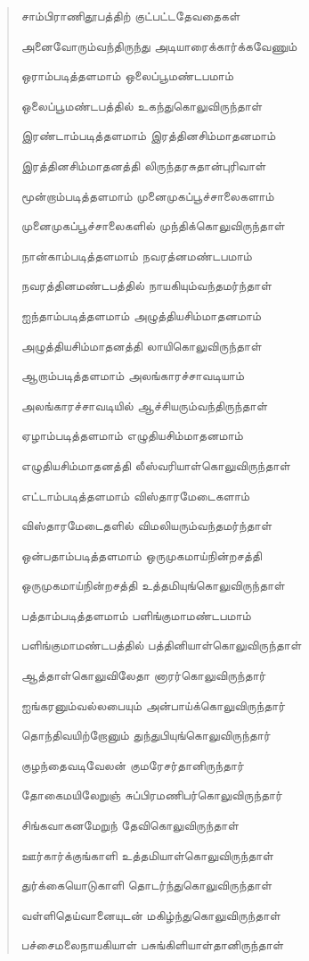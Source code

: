 \documentclass{article}
\begin{document}
\begin{quotation}
{சாம்பிராணிதூபத்திற் குட்பட்டதேவதைகள்

அனைவோரும்வந்திருந்து அடியாரைக்கார்க்கவேணும்

ஒராம்படித்தளமாம் ஒலைப்பூமண்டபமாம்

ஒலைப்பூமண்டபத்தில் உகந்துகொலுவிருந்தாள்

இரண்டாம்படித்தளமாம் இரத்தினசிம்மாதனமாம்

இரத்தினசிம்மாதனத்தி லிருந்தரசுதான்புரிவாள்

மூன்றாம்படித்தளமாம் முனைமுகப்பூச்சாலைகளாம்

முனைமுகப்பூச்சாலைகளில் முந்திக்கொலுவிருந்தாள்

நான்காம்படித்தளமாம் நவரத்னமண்டபமாம்

நவரத்தினமண்டபத்தில் நாயகியும்வந்தமர்ந்தாள்

ஐந்தாம்படித்தளமாம் அழுத்தியசிம்மாதனமாம்

அழுத்தியசிம்மாதனத்தி லாயிகொலுவிருந்தாள்

ஆறாம்படித்தளமாம் அலங்காரச்சாவடியாம்

அலங்காரச்சாவடியில் ஆச்சியரும்வந்திருந்தாள்

ஏழாம்படித்தளமாம் எழுதியசிம்மாதனமாம்

எழுதியசிம்மாதனத்தி லீஸ்வரியாள்கொலுவிருந்தாள்

எட்டாம்படித்தளமாம் விஸ்தாரமேடைகளாம்

விஸ்தாரமேடைதளில் விமலியரும்வந்தமர்ந்தாள்

ஒன்பதாம்படித்தளமாம் ஒருமுகமாய்நின்றசத்தி

ஒருமுகமாய்நின்றசத்தி உத்தமியுங்கொலுவிருந்தாள்

பத்தாம்படித்தளமாம் பளிங்குமாமண்டபமாம்

பளிங்குமாமண்டபத்தில் பத்தினியாள்கொலுவிருந்தாள்

ஆத்தாள்கொலுவிலேதா னாரர்கொலுவிருந்தார்

ஐங்கரனும்வல்லபையும் அன்பாய்க்கொலுவிருந்தார்

தொந்திவயிற்றோனும் துந்துபியுங்கொலுவிருந்தார்

குழந்தைவடிவேலன் குமரேசர்தானிருந்தார்

தோகைமயிலேறுஞ் சுப்பிரமணிபர்கொலுவிருந்தார்

சிங்கவாகனமேறுந் தேவிகொலுவிருந்தாள்

ஊர்கார்க்குங்காளி உத்தமியாள்கொலுவிருந்தாள்

துர்க்கையொடுகாளி தொடர்ந்துகொலுவிருந்தாள்

வள்ளிதெய்வானையுடன் மகிழ்ந்துகொலுவிருந்தாள்

பச்சைமலைநாயகியாள் பசுங்கிளியாள்தானிருந்தாள்

}
\end{quotation}
\end{document}
